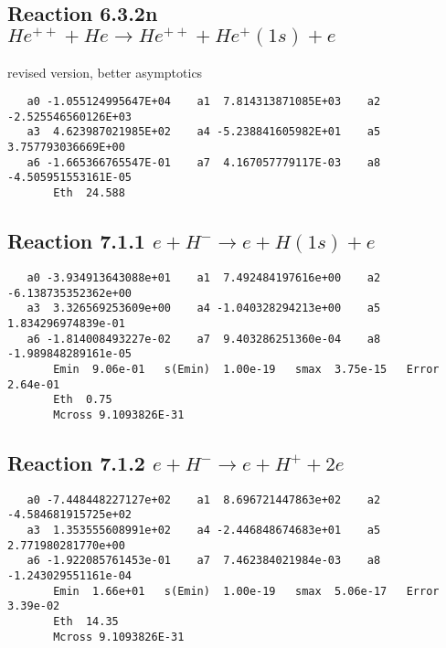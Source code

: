 \documentclass[12pt,dvipdfmx]{article}
\begin{document}
\subsection{
Reaction 6.3.2n $   He^{++} + He \rightarrow He^{++} + He^+(1s) + e$}
revised version, better asymptotics

\begin{small}\begin{verbatim}
   a0 -1.055124995647E+04    a1  7.814313871085E+03    a2  -2.525546560126E+03
   a3  4.623987021985E+02    a4 -5.238841605982E+01    a5   3.757793036669E+00
   a6 -1.665366765547E-01    a7  4.167057779117E-03    a8  -4.505951553161E-05
       Eth  24.588
\end{verbatim}\end{small}


\newpage
\subsection{
Reaction 7.1.1 $   e + H^- \rightarrow e + H(1s) + e$}


\begin{small}\begin{verbatim}
   a0 -3.934913643088e+01    a1  7.492484197616e+00    a2 -6.138735352362e+00
   a3  3.326569253609e+00    a4 -1.040328294213e+00    a5  1.834296974839e-01
   a6 -1.814008493227e-02    a7  9.403286251360e-04    a8 -1.989848289161e-05
       Emin  9.06e-01   s(Emin)  1.00e-19   smax  3.75e-15   Error  2.64e-01
       Eth  0.75
       Mcross 9.1093826E-31
\end{verbatim}\end{small}

\newpage
\subsection{
Reaction 7.1.2 $   e + H^- \rightarrow e + H^+ + 2e$}


\begin{small}\begin{verbatim}
   a0 -7.448448227127e+02    a1  8.696721447863e+02    a2 -4.584681915725e+02
   a3  1.353555608991e+02    a4 -2.446848674683e+01    a5  2.771980281770e+00
   a6 -1.922085761453e-01    a7  7.462384021984e-03    a8 -1.243029551161e-04
       Emin  1.66e+01   s(Emin)  1.00e-19   smax  5.06e-17   Error  3.39e-02
       Eth  14.35
       Mcross 9.1093826E-31
\end{verbatim}\end{small}
\end{document}
